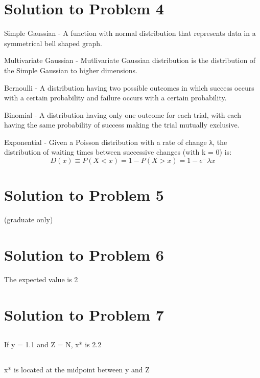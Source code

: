 \documentclass[a4paper]{article}
\begin{document}
\section{Solution to Problem 4}

Simple Gaussian - A function with normal distribution that represents data in a symmetrical bell shaped graph.

Multivariate Gaussian - Mutlivariate Gaussian distribution is the distribution of the Simple Gaussian to higher dimensions. 

Bernoulli - A distribution having two possible outcomes in which success occurs with a certain probability and failure occurs with a certain probability.

Binomial - A distribution having only one outcome for each trial, with each having the same probability of success making the trial mutually exclusive. 

Exponential - Given a Poisson distribution with a rate of change λ, the distribution of waiting times between successive changes (with k = 0) is:
\begin{equation}
D(x) \equiv P (X < x)
	= 1 - P (X > x)
	= 1 - e^-λx
\end{equation}

\section {Solution to Problem 5}

(graduate only)

\section{Solution to Problem 6}

The expected value is 2

\section{Solution to Problem 7}
\subsection{}
If y = 1.1 and Z = N, x* is 2.2
\subsection{}
x* is located at the midpoint between y and Z
\end{document}
